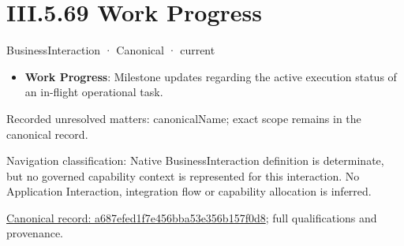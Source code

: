 \section*{III.5.69 Work Progress}
\label{navigation:III.5.69}

\label{element:a687efed1f7e456bba53e356b157f0d8}
{\small BusinessInteraction · Canonical · current}\par

\begin{itemize}


\item \textbf{Work Progress}: Milestone updates regarding the active execution status of an in-flight operational task.

\end{itemize}

{\small Recorded unresolved matters: canonicalName; exact scope remains in the canonical record.}\par
{\small Navigation classification: Native BusinessInteraction definition is determinate, but no governed capability context is represented for this interaction. No Application Interaction, integration flow or capability allocation is inferred.}\par
{\footnotesize \href{../../../../../../../../continuum/business/business-interaction/a687efed1f7e456bba53e356b157f0d8.md}{Canonical record: a687efed1f7e456bba53e356b157f0d8}; full qualifications and provenance.}\par
